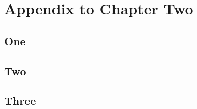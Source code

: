 \chapter{Appendix to Chapter Two}

\section{One}
\lipsum[1]

\section{Two}
\lipsum[2]

\section{Three}
\lipsum[3]